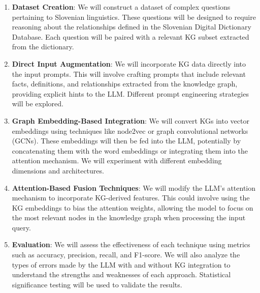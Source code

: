 \documentclass[fleqn,moreauthors,10pt]{ds_report}
\begin{document}
\begin{enumerate}[noitemsep]
    \item \textbf{Dataset Creation}:  We will construct a dataset of complex questions pertaining to Slovenian linguistics. These questions will be designed to require reasoning about the relationships defined in the Slovenian Digital Dictionary Database. Each question will be paired with a relevant KG subset extracted from the dictionary.
    \item \textbf{Direct Input Augmentation}: We will incorporate KG data directly into the input prompts. This will involve crafting prompts that include relevant facts, definitions, and relationships extracted from the knowledge graph, providing explicit hints to the LLM.  Different prompt engineering strategies will be explored.
    \item \textbf{Graph Embedding-Based Integration}:  We will convert KGs into vector embeddings using techniques like node2vec or graph convolutional networks (GCNs). These embeddings will then be fed into the LLM, potentially by concatenating them with the word embeddings or integrating them into the attention mechanism. We will experiment with different embedding dimensions and architectures.
    \item \textbf{Attention-Based Fusion Techniques}: We will modify the LLM's attention mechanism to incorporate KG-derived features. This could involve using the KG embeddings to bias the attention weights, allowing the model to focus on the most relevant nodes in the knowledge graph when processing the input query.
    \item \textbf{Evaluation}:  We will assess the effectiveness of each technique using metrics such as accuracy, precision, recall, and F1-score.  We will also analyze the types of errors made by the LLM with and without KG integration to understand the strengths and weaknesses of each approach.  Statistical significance testing will be used to validate the results.
\end{enumerate}




\end{document}

